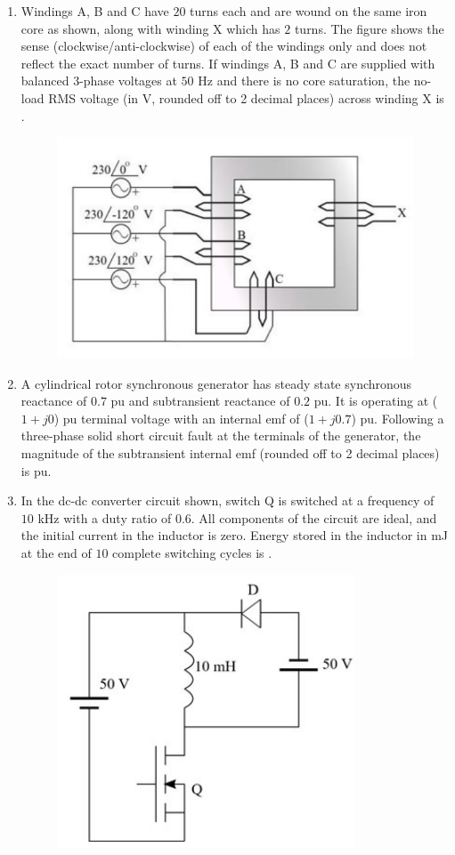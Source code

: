 \documentclass[journal,12pt,onecolumn]{IEEEtran}
\theoremstyle{remark}
\begin{document}
\begin{enumerate}[start=1, label=Q.\arabic*]
    \item Windings A, B and C have $20$ turns each and are wound on the same iron core as shown, along with winding X which has $2$ turns. The figure shows the sense (clockwise/anti-clockwise) of each of the windings only and does not reflect the exact number of turns. If windings A, B and C are supplied with balanced 3-phase voltages at $50$ Hz and there is no core saturation, the no-load RMS voltage (in V, rounded off to 2 decimal places) across winding X is \underline{\hspace{2cm}}.
    \begin{figure}[H]
        \centering
        \includegraphics[width=0.6\columnwidth]{Figures/qs61.png}
        \caption{}
    \end{figure}

    \hfill{}

    \item A cylindrical rotor synchronous generator has steady state synchronous reactance of $0.7$ pu and subtransient reactance of $0.2$ pu. It is operating at ($1+j0$) pu terminal voltage with an internal emf of ($1+j0.7$) pu. Following a three-phase solid short circuit fault at the terminals of the generator, the magnitude of the subtransient internal emf (rounded off to 2 decimal places) is \underline{\hspace{2cm}} pu.

    \hfill{}

    \item In the dc-dc converter circuit shown, switch Q is switched at a frequency of $10$ kHz with a duty ratio of $0.6$. All components of the circuit are ideal, and the initial current in the inductor is zero. Energy stored in the inductor in mJ  at the end of $10$ complete switching cycles is \underline{\hspace{2cm}}.
    \begin{figure}[H]
        \centering
        \includegraphics[width=0.4\columnwidth]{Figures/qs63.png}
        \caption{}
    \end{figure}


\end{enumerate}
\end{document}

